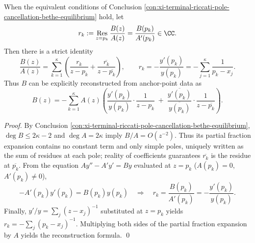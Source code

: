 \begin{conclusion}\label{con:xi-terminal-van-vleck-ratio-residue-partial-fraction-reconstruction}
When the equivalent conditions of Conclusion \ref{con:xi-terminal-riccati-pole-cancellation-bethe-equilibrium} hold, let
\[
r_k:=\operatorname*{Res}_{z=p_k}\frac{B(z)}{A(z)}=\frac{B(p_k)}{A'(p_k)}\in\CC.
\]
Then there is a strict identity
\[
\frac{B(z)}{A(z)}=\sum_{k=1}^{\kappa}\left(\frac{r_k}{z-p_k}+\frac{\overline{r_k}}{z-\overline{p_k}}\right),
\qquad
r_k=-\frac{y'(p_k)}{y(p_k)}=-\sum_{j=1}^{\kappa}\frac{1}{p_k-x_j}.
\]
Thus \(B\) can be explicitly reconstructed from anchor-point data as
\[
B(z)=
-\sum_{k=1}^{\kappa}A(z)\left(
\frac{y'(p_k)}{y(p_k)}\cdot\frac{1}{z-p_k}
\;+\;
\frac{\overline{y'(p_k)}}{\overline{y(p_k)}}\cdot\frac{1}{z-\overline{p_k}}
\right).
\]
\end{conclusion}
\begin{proof}
By Conclusion \ref{con:xi-terminal-riccati-pole-cancellation-bethe-equilibrium}, \(\deg B\le 2\kappa-2\) and \(\deg A=2\kappa\) imply \(B/A=O(z^{-2})\).
Thus its partial fraction expansion contains no constant term and only simple poles, uniquely written as the sum of residues at each pole; reality of coefficients guarantees \(\overline{r_k}\) is the residue at \(\overline{p_k}\).
From the equation \(Ay''-A'y'=By\) evaluated at \(z=p_k\) (\(A(p_k)=0\), \(A'(p_k)\neq 0\)),
\[
-A'(p_k)y'(p_k)=B(p_k)y(p_k)\quad\Longrightarrow\quad r_k=\frac{B(p_k)}{A'(p_k)}=-\frac{y'(p_k)}{y(p_k)}.
\]
Finally, \(y'/y=\sum_j(z-x_j)^{-1}\) substituted at \(z=p_k\) yields \(r_k=-\sum_j(p_k-x_j)^{-1}\).
Multiplying both sides of the partial fraction expansion by \(A\) yields the reconstruction formula. \qed
\end{proof}

